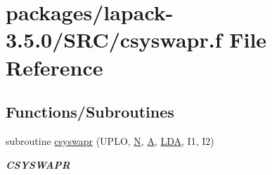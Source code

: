 \hypertarget{csyswapr_8f}{}\section{packages/lapack-\/3.5.0/\+S\+R\+C/csyswapr.f File Reference}
\label{csyswapr_8f}
\subsection*{Functions/\+Subroutines}
\begin{DoxyCompactItemize}
\item 
subroutine \hyperlink{group__complexSYauxiliary_ga9f9a3d10086d7de0fcb0a4732c2e9b21}{csyswapr} (U\+P\+L\+O, \hyperlink{polmisc_8c_a0240ac851181b84ac374872dc5434ee4}{N}, \hyperlink{classA}{A}, \hyperlink{example__user_8c_ae946da542ce0db94dced19b2ecefd1aa}{L\+D\+A}, I1, I2)
\begin{DoxyCompactList}\small\item\em {\bfseries C\+S\+Y\+S\+W\+A\+P\+R} \end{DoxyCompactList}\end{DoxyCompactItemize}
